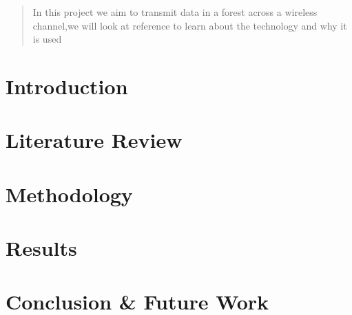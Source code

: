 \documentclass[11pt]{report}
\begin{document}


\newpage
\tableofcontents
\listoffigures
\listoftables
\lstlistoflistings
\newpage

\begin{abstract}
  In this project we aim to transmit data in a forest across a wireless channel,we will look at reference to learn about the technology and why it is  used 
\end{abstract}
\chapter{Introduction}

% 
% 		


\chapter{Literature Review}

\chapter{Methodology}

\chapter{Results}



\chapter{Conclusion \& Future Work }


\newpage
{}



\newpage
\appendix
\end{document}
